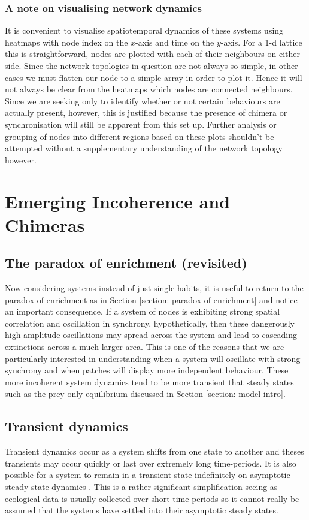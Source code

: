 \documentclass[12pt]{article}
\begin{document}
\subsubsection{A note on visualising network dynamics}
It is convenient to visualise spatiotemporal dynamics of these systems using heatmaps with node index on the $x$-axis and time on the $y$-axis. For a 1-d lattice this is straightforward, nodes are plotted with each of their neighbours on either side. Since the network topologies in question are not always so simple, in other cases we must flatten our node to a simple array in order to plot it. Hence it will not always be clear from the heatmaps which nodes are connected neighbours. Since we are seeking only to identify whether or not certain behaviours are actually present, however, this is justified because the presence of chimera or synchronisation will still be apparent from this set up. Further analysis or grouping of nodes into different regions based on these plots shouldn't be attempted without a supplementary understanding of the network topology however.

\section{Emerging Incoherence and Chimeras}\label{section:chimeras}
\subsection{The paradox of enrichment (revisited)}
Now considering systems instead of just single habits, it is useful to return to the paradox of enrichment as in Section \ref{section: paradox of enrichment} and notice an important consequence. If a system of nodes is exhibiting strong spatial correlation and oscillation in synchrony, hypothetically, then these dangerously high amplitude oscillations may spread across the system and lead to cascading extinctions across a much larger area. This is one of the reasons that we are particularly interested in understanding when a system will oscillate with strong synchrony and when patches will display more independent behaviour. These more incoherent system dynamics tend to be more transient that steady states such as the prey-only equilibrium discussed in Section \ref{section: model intro}.

\subsection{Transient dynamics}
Transient dynamics occur as a system shifts from one state to another and theses transients may occur quickly or last over extremely long time-periods. It is also possible for a system to remain in a transient state indefinitely \cite{transientsweb}  on asymptotic steady state dynamics \cite{hastings2004transients,hastings2018transient}. This is a rather significant simplification seeing as ecological data is usually collected over short time periods so it cannot really be assumed that the systems have settled into their asymptotic steady states.
\end{document}
